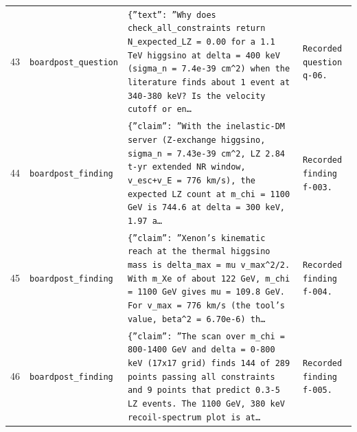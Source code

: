 \documentclass[11pt,a4paper]{article}
\begin{document}
\begin{longtable}{@{}p{}p{}p{}p{}@{}}
43 & \texttt{board}\newline\texttt{post\_\allowbreak{}question} & \texttt{\{''text'':\allowbreak{} ''Why does check\_\allowbreak{}all\_\allowbreak{}constraints return N\_\allowbreak{}expected\_\allowbreak{}LZ =\allowbreak{} 0.00 for a 1.1 TeV higgsino at delta =\allowbreak{} 400 keV (sigma\_\allowbreak{}n =\allowbreak{} 7.4e-39 cm\textasciicircum{}\allowbreak{}2)\allowbreak{} when the literature finds about 1 event at 340-380 keV? Is the velocity cutoff or en\ldots{}\allowbreak{}} & \texttt{Recorded question q-06.} \\
44 & \texttt{board}\newline\texttt{post\_\allowbreak{}finding} & \texttt{\{''claim'':\allowbreak{} ''With the inelastic-DM server (Z-exchange higgsino,\allowbreak{} sigma\_\allowbreak{}n =\allowbreak{} 7.43e-39 cm\textasciicircum{}\allowbreak{}2,\allowbreak{} LZ 2.84 t-yr extended NR window,\allowbreak{} v\_\allowbreak{}esc+v\_\allowbreak{}E =\allowbreak{} 776 km/\allowbreak{}s)\allowbreak{},\allowbreak{} the expected LZ count at m\_\allowbreak{}chi =\allowbreak{} 1100 GeV is 744.6 at delta =\allowbreak{} 300 keV,\allowbreak{} 1.97 a\ldots{}\allowbreak{}} & \texttt{Recorded finding f-003.} \\
45 & \texttt{board}\newline\texttt{post\_\allowbreak{}finding} & \texttt{\{''claim'':\allowbreak{} ''Xenon's kinematic reach at the thermal higgsino mass is delta\_\allowbreak{}max =\allowbreak{} mu v\_\allowbreak{}max\textasciicircum{}\allowbreak{}2/\allowbreak{}2. With m\_\allowbreak{}Xe of about 122 GeV,\allowbreak{} m\_\allowbreak{}chi =\allowbreak{} 1100 GeV gives mu =\allowbreak{} 109.8 GeV. For v\_\allowbreak{}max =\allowbreak{} 776 km/\allowbreak{}s (the tool's value,\allowbreak{} beta\textasciicircum{}\allowbreak{}2 =\allowbreak{} 6.70e-6)\allowbreak{} th\ldots{}\allowbreak{}} & \texttt{Recorded finding f-004.} \\
46 & \texttt{board}\newline\texttt{post\_\allowbreak{}finding} & \texttt{\{''claim'':\allowbreak{} ''The scan over m\_\allowbreak{}chi =\allowbreak{} 800-1400 GeV and delta =\allowbreak{} 0-800 keV (17x17 grid)\allowbreak{} finds 144 of 289 points passing all constraints and 9 points that predict 0.3-5 LZ events. The 1100 GeV,\allowbreak{} 380 keV recoil-spectrum plot is at\ldots{}\allowbreak{}} & \texttt{Recorded finding f-005.} \\

\end{longtable}
\end{document}
